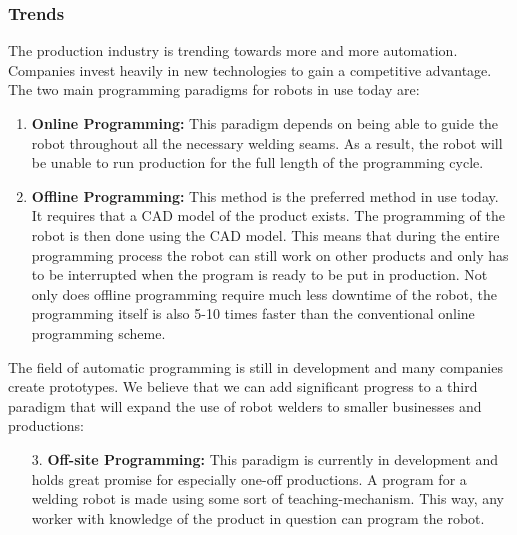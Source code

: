 \subsubsection{Trends}
\label{sec:trends}
The production industry is trending towards more and more automation.
Companies invest heavily in new technologies to gain a competitive advantage. 
The two main programming paradigms for robots in use today are:
\begin{enumerate}
\item \textbf{Online Programming:} This paradigm depends on being able to guide the robot throughout all the necessary welding seams. As a result, the robot will be unable to run production for the full length of the programming cycle.
\item \textbf{Offline Programming:} This method is the preferred method in use today. It requires that a CAD model of the product exists. 
The programming of the robot is then done using the CAD model. 
This means that during the entire programming process the robot can still work on other products and only has to be interrupted when the program is ready to be put in production. 
Not only does offline programming require much less downtime of the robot, the programming itself is also 5-10 times faster than the conventional online programming scheme.	
\end{enumerate}
The field of automatic programming is still in development and many companies create prototypes. We believe that we can add significant progress to a third paradigm that will expand the use of robot welders to smaller businesses and productions:
\begin{enumerate}
	\item[3.]{\textbf{Off-site Programming:}} This paradigm is currently in development and holds great promise for especially one-off productions. A program for a welding robot is made using some sort of teaching-mechanism. 
	This way, any worker with knowledge of the product in question can program the robot.
\end{enumerate}
